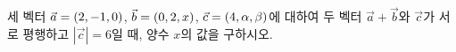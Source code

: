 세 벡터 $\vec{a}=(2{,}\mkern3mu\mathopen{}-1{,}\mkern3mu\mathopen{}0)$, $\vec{b}=(0{,}\mkern3mu\mathopen{}2{,}\mkern3mu\mathopen{}x)$, $\vec{c}=(4{,}\mkern3mu\mathopen{}\alpha{,}\mkern3mu\mathopen{}\beta)$에 대하여 두 벡터 $\vec{a}+\vec{b}$와 $\vec{c}$가 서로 평행하고 $|\vec{c}|=6$일 때, 양수 $x$의 값을 구하시오.
